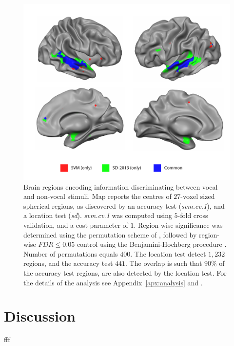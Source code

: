\documentclass[12pt,a4paper]{article}
\begin{document}
\begin{figure}[th]
\centering
\includegraphics[width=0.7\linewidth]{"art/svm_vs_SD"}
\caption{\footnotesize
Brain regions encoding information discriminating between vocal and non-vocal stimuli.
Map reports the centres of $27$-voxel sized spherical regions, as discovered by an accuracy test (\emph{svm.cv.1}), and a location test (\emph{sd}). 
\emph{svm.cv.1} was computed using $5$-fold cross validation, and a cost parameter of $1$. 
Region-wise significance was determined using the permutation scheme of \cite{stelzer_statistical_2013}, followed by region-wise $FDR \leq 0.05$ control using the Benjamini-Hochberg procedure \citep{benjamini_controlling_1995}.
Number of permutations equals $400$.
The location test detect $1,232$ regions, and the accuracy test $441$. The overlap is such that $90\%$ of the accuracy test regions, are also detected by the location test. 
For the details of the analysis see Appendix~\ref{apx:analysis} and \cite{gilron_quantifying_2016}.  
  }
\label{fig:read_data}
\end{figure}








\section{Discussion}
\label{sec:discussion}





fff
\end{document}

